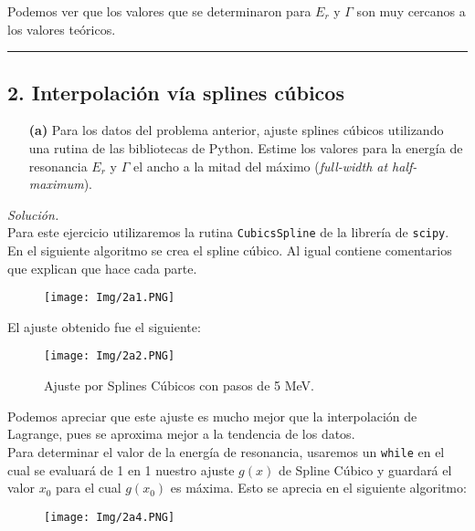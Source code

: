 \documentclass[11pt]{article}
\begin{document}
	Podemos ver que los valores que se determinaron para $E_r$ y $\Gamma$ son muy cercanos a los valores teóricos.\\
	
\hrule
\subsection*{\textbf{2. Interpolación vía splines cúbicos}}

\begin{enumerate}
	\item [\textbf{(a)}] Para los datos del problema anterior, ajuste splines cúbicos utilizando una rutina de las bibliotecas de Python. Estime los valores para la energía de resonancia $E_r$ y $\Gamma$ el ancho a la mitad del máximo (\textit{full-width at half-maximum}).
\end{enumerate}
	\textit{Solución.}\\
	Para este ejercicio utilizaremos la rutina \texttt{CubicsSpline} de la librería de \texttt{scipy}. En el siguiente algoritmo se crea el spline cúbico. Al igual contiene comentarios que explican que hace cada parte.
	\begin{figure}[h]
		\centering
		\texttt{[image: Img/2a1.PNG]}
	\end{figure}

	El ajuste obtenido fue el siguiente:
\newpage

	\begin{figure}[h]
		\centering
		\texttt{[image: Img/2a2.PNG]}
		\caption{Ajuste por Splines Cúbicos con pasos de 5 MeV.}
	\end{figure}
	
	Podemos apreciar que este ajuste es mucho mejor que la interpolación de Lagrange, pues se aproxima mejor a la tendencia de los datos.\\
	Para determinar el valor de la energía de resonancia, usaremos un \texttt{while} en el cual se evaluará de 1 en 1 nuestro ajuste $g(x)$ de Spline Cúbico y guardará el valor $x_0$ para el cual $g(x_0)$ es máxima. Esto se aprecia en el siguiente algoritmo: 
	\begin{figure}[h]
		\centering
		\texttt{[image: Img/2a4.PNG]}
	\end{figure}
\end{document}
